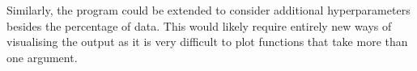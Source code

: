 \documentclass[a4paper,12pt,twoside,openright]{report}
\begin{document}
Similarly, the program could be extended to consider additional hyperparameters besides the percentage of data. This would likely require entirely new ways of visualising the output as it is very difficult to plot functions that take more than one argument.







\appendix
\singlespacing

 

\end{document}
